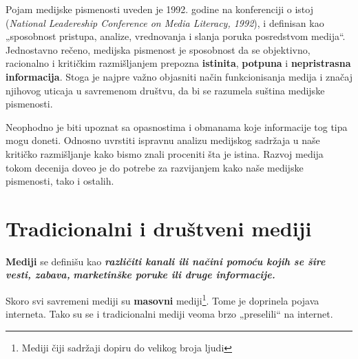 \documentclass[a4paper]{article}
\begin{document}
Pojam medijske pismenosti uveden je 1992. godine na konferenciji o istoj (\emph{National Leadereship Conference on Media Literacy, 1992}), i definisan kao „sposobnost pristupa, analize, vrednovanja i slanja poruka posredstvom medija“. Jednostavno rečeno, medijska pismenost je sposobnost da se objektivno, racionalno i kritičkim razmišljanjem prepozna \textbf{istinita}, \textbf{potpuna} i \textbf{nepristrasna informacija}.  
Stoga je najpre važno objasniti način funkcionisanja medija i značaj njihovog uticaja u savremenom društvu, da bi se razumela suština medijske pismenosti.

Neophodno je biti upoznat sa opasnostima i obmanama koje informacije tog tipa mogu doneti. Odnosno uvrstiti ispravnu analizu medijskog sadržaja u naše kritičko razmišljanje kako bismo znali proceniti šta je istina. Razvoj medija tokom decenija doveo je do potrebe za razvijanjem kako naše medijske pismenosti, tako i ostalih.

\newpage

\section{Tradicionalni i društveni mediji}

	\textbf{{Mediji}} se definišu kao \emph{\textbf{{različiti kanali ili
			načini pomoću kojih se šire vesti, zabava,}}} \emph{\textbf{{marketinške
			poruke ili druge informacije.}}}

Skoro svi savremeni mediji su \textbf{masovni} mediji\footnote{Mediji čiji sadržaji dopiru do velikog broja ljudi}. Tome je doprinela
pojava interneta. Tako su se i tradicionalni mediji veoma brzo
„preselili`` na internet.
\end{document}
